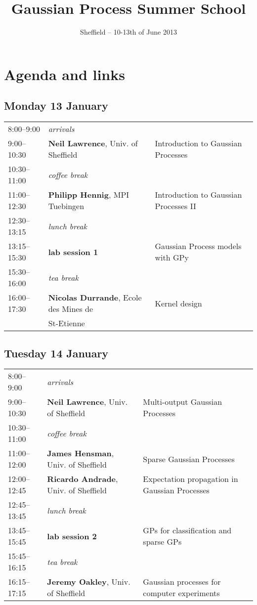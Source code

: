 \documentclass{article}
\title{Gaussian Process Summer School}
\author{Sheffield -- 10-13th of June 2013}
\date{\null}
\begin{document}
\section*{Agenda and links}
\doublespacing

\subsection*{\textcolor{MyDarkBlue}{Monday 13 January}}
\begin{tabular}{l p{6.5cm} p{7.75cm}}
 8:00--9:00   & \textit{arrivals} & \\
 9:00--10:30  & \textbf{Neil Lawrence}, Univ. of Sheffield & Introduction to Gaussian Processes \\
 10:30--11:00 & \textit{coffee break} & \\
 11:00--12:30 & \textbf{Philipp Hennig}, MPI Tuebingen & Introduction to Gaussian Processes II \\
 12:30--13:15 & \textit{lunch break} & \\
 13:15--15:30 & \textbf{lab session 1} & Gaussian Process models with GPy \\
 15:30--16:00 & \textit{tea break} & \\
 16:00--17:30 & \textbf{Nicolas Durrande}, Ecole des Mines de & Kernel design \\
	      & St-Etienne					& \\	
\end{tabular}

\vspace{0.5cm}
\subsection*{\textcolor{MyDarkBlue}{Tuesday 14 January}}
\begin{tabular}{l p{6.5cm} p{7.75cm}}
8:00--9:00   & \textit{arrivals} & \\
9:00--10:30  & \textbf{Neil Lawrence}, Univ. of Sheffield  & Multi-output Gaussian Processes \\
10:30--11:00 & \textit{coffee break} & \\
11:00--12:00 & \textbf{James Hensman}, Univ. of Sheffield & Sparse Gaussian Processes \\
12:00--12:45 & \textbf{Ricardo Andrade}, Univ. of Sheffield & Expectation propagation in Gaussian Processes \\
12:45--13:45 & \textit{lunch break} & \\
13:45--15:45 & \textbf{lab session 2} & GPs for classification and sparse GPs \\
15:45--16:15 & \textit{tea break} & \\
16:15--17:15 & \textbf{Jeremy Oakley}, Univ. of Sheffield & Gaussian processes for computer experiments \\
\end{tabular}
\end{document}
